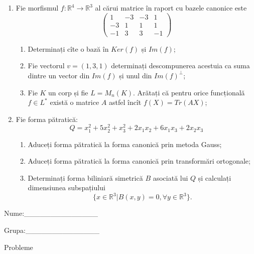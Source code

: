 \documentclass{article}
\begin{document}
\begin{enumerate}
 \item Fie morfismul $f:\mathbb{R}^4 \to \mathbb{R}^3$ al cărui matrice în raport cu bazele canonice este
$$\begin{pmatrix}
1&-3&-3&1\\
-3&1&1&1\\
-1&3&3&-1
\end{pmatrix}$$

\begin{enumerate}
\item Determinați cîte o bază în $Ker(f)$ și $Im(f)$;
\item Fie vectorul $v=(1,3,1)$ determinați descompunerea acestuia ca suma dintre un vector din $Im(f)$ și unul din $Im(f)^\perp$;
\item Fie $K$ un corp și fie $L=M_n(K)$. Arătați că pentru orice funcțională $f \in L^*$ există o matrice $A$ astfel încît $f(X)=Tr(AX)$;
\end{enumerate}
\item Fie forma pătratică:
$$Q= x_1^2+5x_2^2+x_3^2+2x_1x_2+6x_1x_3+2x_2x_3$$

\begin{enumerate}
\item Aduceți forma pătratică la forma canonică prin metoda Gauss;
\item Aduceți forma pătratică la forma canonică prin transformări ortogonale;
\item Determinați forma biliniară simetrică $B$ asociată lui $Q$ și calculați dimensiunea subspațiului
$$\{x \in \mathbb{R}^3 | B(x,y)=0,\forall y \in \mathbb{R}^3\}.$$

\end{enumerate}
\end{enumerate}
\newpage
\begin{flushright}
Nume:\_\_\_\_\_\_\_\_\_\_\_\_\_\_
 
 
Grupa:\_\_\_\_\_\_\_\_\_\_\_\_\_\_
\end{flushright}
\begin{center}
\vspace{2cm}
{\Large Probleme}
\vspace{2cm}
\end{center}
\end{document}
